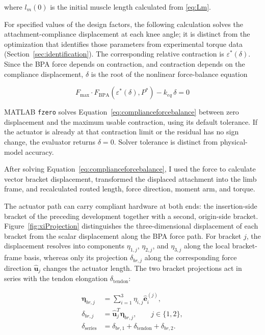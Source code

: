 where $l_m{(0)}$ is the initial muscle length calculated from \eqref{eq:Lm}.

For specified values of the design factors, the following calculation solves the attachment-compliance displacement at each knee angle; it is distinct from the optimization that identifies those parameters from experimental torque data (Section~\ref{sec:identification}). The corresponding relative contraction is $\varepsilon^*(\delta)$. Since the BPA force depends on contraction, and contraction depends on the compliance displacement, $\delta$ is the root of the nonlinear force-balance equation

\begin{equation} F_{\mathrm{max}} \cdot F_{\mathrm{BPA}}\!\left(\varepsilon^*(\delta),P^*\right) - k_{eq}\,\delta = 0
\label{eq:complianceforcebalance}
\end{equation}

MATLAB \texttt{fzero} solves Equation~\eqref{eq:complianceforcebalance} between zero displacement and the maximum usable contraction, using its default tolerance. If the actuator is already at that contraction limit or the residual has no sign change, the evaluator returns $\delta=0$. Solver tolerance is distinct from physical-model accuracy.

After solving Equation~\eqref{eq:complianceforcebalance}, I used the force to calculate vector bracket displacement, transformed the displaced attachment into the limb frame, and recalculated routed length, force direction, moment arm, and torque.

The actuator path can carry compliant hardware at both ends: the insertion-side bracket of the preceding development together with a second, origin-side bracket. Figure~\ref{fig:xiProjection} distinguishes the three-dimensional displacement of each bracket from the scalar displacement along the BPA force path. For bracket $j$, the displacement resolves into components $\eta_{1,j}$, $\eta_{2,j}$, and $\eta_{3,j}$ along the local bracket-frame basis, whereas only its projection $\delta_{br,j}$ along the corresponding force direction $\hat{\mathbf{u}}_j$ changes the actuator length. The two bracket projections act in series with the tendon elongation $\delta_{\mathrm{tendon}}$:

\begin{equation}
\begin{aligned}
\boldsymbol{\eta}_{br,j} &= \sum_{i=1}^{3}\eta_{i,j}\hat{\mathbf{e}}_i^{(j)},\\
\delta_{br,j} &= \hat{\mathbf{u}}_j^T\boldsymbol{\eta}_{br,j}, \qquad j\in\{1,2\},\\
\delta_{\mathrm{series}} &= \delta_{br,1}+\delta_{\mathrm{tendon}}+\delta_{br,2}.
\end{aligned}
\label{eq:bracket_series_projection}
\end{equation}

